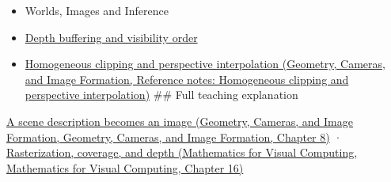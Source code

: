 \begin{itemize}
\item
  {Worlds, Images and Inference}
\item
  \hyperref[appendix-97578ed97952]{Depth buffering and visibility order}
\item
  \href{../03-Geometry-Cameras-and-Image-Formation/main.pdf\#nameddest=appendix-40426e4b2103}{Homogeneous clipping and perspective interpolation (Geometry, Cameras, and Image Formation, Reference notes: Homogeneous clipping and perspective interpolation)} \#\# Full teaching explanation
\end{itemize}

\href{../03-Geometry-Cameras-and-Image-Formation/main.pdf\#nameddest=03-visual-computing-i-ch001-a-scene-description-becomes-an-image}{A scene description becomes an image (Geometry, Cameras, and Image Formation, Geometry, Cameras, and Image Formation, Chapter 8)} · \href{../02-Mathematics-for-Visual-Computing/main.pdf\#nameddest=03-visual-computing-i-ch012-rasterization-coverage-and-depth}{Rasterization, coverage, and depth (Mathematics for Visual Computing, Mathematics for Visual Computing, Chapter 16)}
